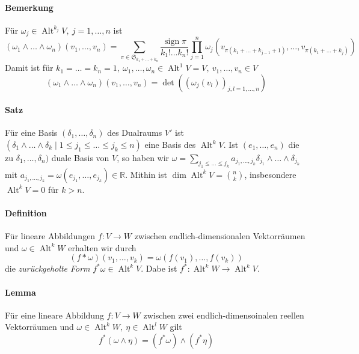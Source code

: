 \documentclass[12pt,a4paper,fleqn]{article}
\def\R{{\mathbb{R}}}
\begin{document}
\paragraph{Bemerkung} Für $\omega_j \in \operatorname{Alt}^{k_j} V,\ j = 1, \dots, n$ ist
\begin{displaymath}
(\omega_1\wedge \dots\wedge \omega_n)(v_1, \dots, v_n) = \sum_{\pi \in \mathfrak{S}_{k_1+\dots +k_n}} \frac{\operatorname{sign}\pi}{k_1!\dots k_n!} \prod_{j=1}^n \omega_j (v_{ \pi(k_1+\dots +k_{j-1}+1)}, \dots, v_{\pi(k_1+\dots+k_j)})
\end{displaymath}
Damit ist für $k_1 = \dots = k_n = 1,\ \omega_1, \dots, \omega_n \in \operatorname{Alt}^1 V = V,\ v_1, \dots, v_n \in V$
\begin{displaymath}
(\omega_1\wedge\dots\wedge\omega_n)(v_1, \dots, v_n) = \det ((\omega_j(v_l))_{j, l = 1, \dots, n})
\end{displaymath}

\paragraph{Satz} Für eine Basis $(\delta_1, \dots, \delta_n)$ des Dualraums $V'$ ist ${(\delta_1\wedge\dots\wedge\delta_k \mid 1\leq j_1\leq\dots\leq j_k \leq n)}$ eine Basis des $\operatorname{Alt}^k V$. 
Ist $(e_1, \dots, e_n)$ die zu $\delta_1, \dots, \delta_n)$ duale Basis von $V$, so haben wir $\omega = \sum_{j_1\leq \dots\leq j_k} a_{j_1, \dots, j_k} \delta_{j_1}\wedge\dots\wedge\delta_{j_k}$ mit $a_{j_1, \dots, j_k} = \omega(e_{j_1}, \dots, e_{j_k})\in \R$. 
Mithin ist $\dim\operatorname{Alt}^k V = \binom{n}{k}$, insbesondere $\operatorname{Alt}^k V = 0$ für $k > n$.

\paragraph{Definition} Für lineare Abbildungen $f\colon V \rightarrow W$ zwischen endlich-dimensionalen Vektorräumen und $\omega \in \operatorname{Alt}^k W$ erhalten wir durch 
\begin{displaymath}
(f*\omega)(v_1, \dots, v_k) = \omega(f(v_1), \dots, f(v_k))
\end{displaymath}
die \textit{zurückgeholte Form} $f^\ast\omega \in \operatorname{Alt}^k V$. Dabe ist $f^\ast\colon \operatorname{Alt}^k W \rightarrow \operatorname{Alt}^k V$.

\paragraph{Lemma} Für eine lineare Abbildung $f\colon V \rightarrow W$ zwischen zwei endlich-dimensoinalen reellen Vektorräumen und $\omega\in \operatorname{Alt}^k W,\ \eta \in \operatorname{Alt}^l W$ gilt
\begin{displaymath}
f^\ast(\omega\wedge\eta) = (f^\ast\omega)\wedge(f^\ast\eta)
\end{displaymath}
\end{document}
